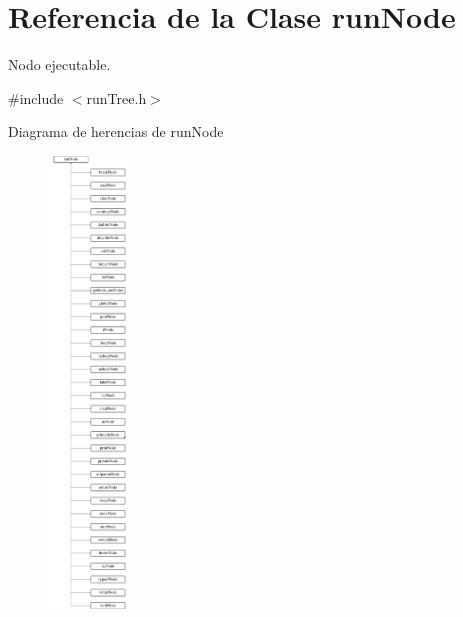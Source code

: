 \hypertarget{classrunNode}{\section{Referencia de la Clase run\-Node}
\label{classrunNode}
}


Nodo ejecutable.  




{\ttfamily \#include $<$run\-Tree.\-h$>$}

Diagrama de herencias de run\-Node\begin{figure}[H]
\begin{center}
\leavevmode
\includegraphics[height=12.000000cm]{classrunNode}
\end{center}
\end{figure}

